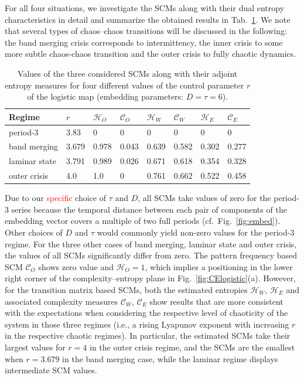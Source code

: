 \documentclass[aip,cha,reprint,nofootinbib]{revtex4-1}
\begin{document}
For all four situations, we investigate the SCMs along with their dual entropy characteristics in detail and summarize the obtained results in Tab.~\ref{tableLog}. We note that several types of chaos--chaos transitions will be discussed in the following: the band merging crisis corresponds to intermittency, the inner crisis to some more subtle chaos-chaos transition and the outer crisis to fully chaotic dynamics. 
\begin{table}[htb]
    {\begin{tabular}{l  l  l  l  l  l  l  l}
    \hline
    Regime & $r$      & $\mathcal{H}_O$ & $\mathcal{C}_O$ & $\mathcal{H}_W$ & $\mathcal{C}_W$ & $\mathcal{H}_E$   & $\mathcal{C}_E$  \\
    \hline
    period-3      & 3.83 & 0 & 0 & 0 & 0 & 0 & 0 \\
    \hline
    band merging    & 3.679 & 0.978 & 0.043 & 0.639 & 0.582 & 0.302 & 0.277  \\
    \hline
    laminar state    & 3.791 & 0.989 & 0.026 & 0.671 & 0.618 & 0.354 & 0.328 \\
    \hline
    outer crisis  & 4.0 & 1.0 & 0 & 0.761 & 0.662 & 0.522 & 0.458 \\
    \hline
    \end{tabular}}
   \caption{Values of the three considered SCMs along with their adjoint entropy measures for four different values of the control parameter $r$ of the logistic map (embedding parameters: $D = \tau = 6$).   \label{tableLog}}    
\end{table}

Due to our \textcolor{red}{specific} choice of $\tau$ and $D$, all SCMs take values of zero for the period-3 series because the temporal distance between each pair of components of the embedding vector covers a multiple of two full periods (cf.~Fig.~\ref{fig:embed}). Other choices of $D$ and $\tau$ would commonly yield non-zero values for the period-3 regime. For the three other cases of band merging, laminar state and outer crisis, the values of all SCMs significantly differ from zero. The pattern frequency based SCM $\mathcal{C}_O$ shows zero value and $\mathcal{H}_{O} = 1$, which implies a positioning in the lower right corner of the complexity--entropy plane in Fig.~\ref{fig:CElogistic}(a). However, for the transition matrix based SCMs, both the estimated entropies $\mathcal{H}_W$, $\mathcal{H}_E$ and associated complexity measures $\mathcal{C}_W$, $\mathcal{C}_E$ show results that are more consistent with the expectations when considering the respective level of chaoticity of the system in those three regimes (i.e., a rising Lyapunov exponent with increasing $r$ in the respective chaotic regimes). In particular, the estimated SCMs take their largest values for $r = 4$ in the outer crisis regime, and the SCMs are the smallest when $r = 3.679$ in the band merging case, while the laminar regime displays intermediate SCM values. 
\end{document}
